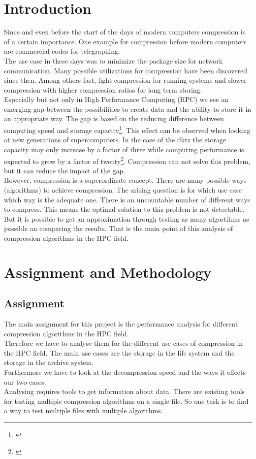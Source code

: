 \documentclass[
	12pt,
	a4paper,
	BCOR10mm,
	DIV14,
	listof=totoc,
	bibliography=totoc,
	headsepline
]{scrreprt}
\newcommand*{\mcite}[1]{\footnote{\cite{#1}}}
\begin{document}
\chapter{Introduction}
\label{Introduction}
Since and even before the start of the days of modern computers compression is of a certain importance. 
One example for compression before modern computers are commercial codes for telegraphing.
\\
The use case in these days was to minimize the package size for network communication.
Many possible utilizations for compression have been discovered since then.
Among others fast, light compression for running systems and slower compression with higher compression ratios for long term storing. 
\\
Especially but not only in High Performance Computing (HPC) we see an emerging gap between the possibilities to create data and the ability to store it in an appropriate way. 
The gap is based on the reducing difference between computing speed and storage capacity\mcite{ExaStoSy}.
This effect can be observed when looking at new generations of supercomputers. 
In the case of the dkrz the storage capacity may only increase by a factor of three while computing performance is expected to grow by a factor of twenty\mcite{ExaStoSy}.
Compression can not solve this problem, but it can reduce the impact of the gap. 
\\
However, compression is a superordinate concept.
There are many possible ways (algorithms) to achieve compression.
The arising question is for which use case which way is the adequate one.
There is an uncountable number of different ways to compress.
This means the optimal solution to this problem is not detectable.
But it is possible to get an approximation through testing as many algortihms as possible an comparing the results.
That is the main point of this analysis of compression algorithms in the HPC field.


\chapter{Assignment and Methodology}
\label{Assignment and Methodology}
\section*{Assignment}
The main assignment for this project is the performance analysis for different compression algorithms in the HPC field. 
\\
Therefore we have to analyse them for the different use cases of compression in the HPC field. 
The main use cases are the storage in the life system and the storage in the archive system.
\\
Furthermore we have to look at the decompression speed and the ways it effects our two cases. 
\\
Analysing requires tools to get information about data. There are existing tools for testing multiple compression algorithms on a single file. So one task is to find a way to test multiple files with multiple algorithms.
\end{document}
